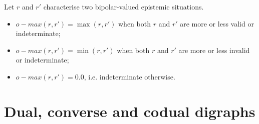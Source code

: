 Let $r$ and $r'$ characterise two bipolar-valued epistemic situations.
\begin{itemize}
\item $o-max(r, r' ) = \max(r, r' )$ when both $r$ and $r'$ are more or less valid or indeterminate;
\item $o-max(r, r' ) = \min(r, r' )$ when both $r$ and $r'$ are more or less invalid or indeterminate;
\item $o-max(r, r' ) = 0.0$, i.e. indeterminate otherwise.
\end{itemize}

\section{Dual, converse and codual digraphs}
\label{sec:2.6}


